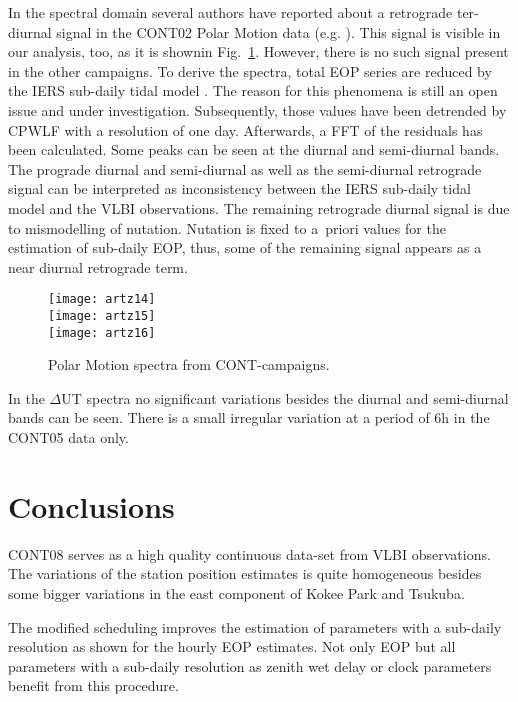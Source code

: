 \documentclass[natbib,twocolumn,twoside]{svmultiag}
\begin{document}
In the spectral domain several authors have reported about a retrograde
ter-diurnal signal in the CONT02 Polar Motion data (e.g. \cite{haas2006a}).
This signal is visible in our analysis, too, as it is shownin
Fig.~\ref{fig:spectrum}.
However, there is no such signal present in the other campaigns.
To derive the spectra, total EOP series are reduced by the IERS sub-daily 
tidal model \citep{iers_conv2004}.
The reason for this phenomena is still an open issue and under investigation.
Subsequently, those values have been detrended by CPWLF with a resolution of 
one day.
Afterwards, a FFT of the residuals has been calculated.
Some peaks can be seen at the diurnal and semi-diurnal bands.
The prograde diurnal and semi-diurnal as well as the semi-diurnal retrograde
signal can be interpreted as inconsistency between the IERS sub-daily tidal
model and the VLBI observations.
The remaining retrograde diurnal signal is due to mismodelling of nutation.
Nutation is fixed to a~priori values for the estimation of sub-daily
EOP, thus, some of the remaining signal appears as a near diurnal retrograde 
term.
\begin{figure}[t]
 \centering
 \texttt{[image: artz14]}\\
 \texttt{[image: artz15]}\\
 \texttt{[image: artz16]}
 \caption{Polar Motion spectra from CONT-campaigns.}
 \label{fig:spectrum}
\end{figure}
In the $\Delta$UT spectra no significant variations besides the diurnal and
semi-diurnal bands can be seen.
There is a small irregular variation at a period of 6h in the CONT05 data
only.

\section{Conclusions}
CONT08 serves as a high quality continuous data-set from VLBI observations.
The variations of the station position estimates is quite homogeneous 
besides some bigger variations in the east component of Kokee Park and Tsukuba.

The modified scheduling improves the estimation of parameters with a sub-daily 
resolution as shown for the hourly EOP estimates.
Not only EOP but all parameters with a sub-daily resolution as zenith wet 
delay or clock parameters benefit from this procedure.
\end{document}
